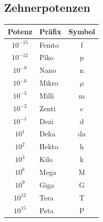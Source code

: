 \subsection{Zehnerpotenzen}
\begin{center}
    \renewcommand{\arraystretch}{1.25}
    \begin{tabular}{|clc|}
        \hline
        \rowcolor{white}
        Potenz & Präfix & Symbol\\
        \hline
        $10^{-15}$   &   Femto   &   f       \\
        $10^{-12}$   &   Piko    &   p       \\
        $10^{-9}$    &   Nano    &   n       \\
        $10^{-6}$    &   Mikro   &   $\mu$   \\
        $10^{-3}$    &   Milli   &   m       \\
        $10^{-2}$    &   Zenti   &   c       \\
        $10^{-1}$    &   Dezi    &   d       \\
        \hline
        $10^1$     &   Deka    &   da      \\
        $10^2$     &   Hekto   &   h       \\
        $10^3$     &   Kilo    &   k       \\
        $10^6$     &   Mega    &   M       \\
        $10^9$     &   Giga    &   G       \\
        $10^{12}$  &   Tera    &   T       \\
        $10^{15}$  &   Peta    &   P       \\
        \hline
    \end{tabular}
\end{center}


